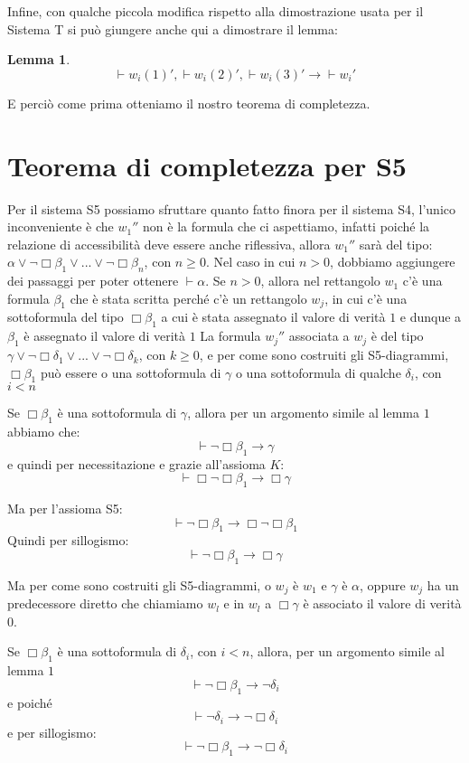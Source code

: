 \documentclass[a4paper, titlepage, 12pt]{report}
\newtheorem{lemma}{Lemma}[chapter]
\begin{document}
Infine, con qualche piccola modifica rispetto
alla dimostrazione usata per il Sistema T si può giungere anche qui a dimostrare il lemma:
\begin{lemma}
$$\vdash w_i(1)', \vdash w_i(2)', \vdash w_i(3)' \rightarrow \vdash w_i'$$
\end{lemma}

E perciò come prima otteniamo il nostro teorema di completezza.

\section{Teorema di completezza per S5}
Per il sistema S5 possiamo sfruttare quanto fatto finora per il sistema S4,
l'unico inconveniente è che $w_1''$ non è la formula che ci aspettiamo,
infatti poiché la relazione di accessibilità deve essere anche riflessiva,
allora $w_1''$ sarà del tipo: $\alpha \lor \neg \Box \beta_1 \lor ... \lor \neg \Box \beta_n$,
con $n \ge 0$.
Nel caso in cui $n > 0$, dobbiamo aggiungere dei passaggi per poter ottenere $\vdash \alpha$.
Se $n > 0$, allora nel rettangolo $w_1$ c'è una formula $\beta_1$ che è stata scritta
perché c'è un rettangolo $w_j$,
in cui c'è una sottoformula del tipo $\Box \beta_1$
a cui è stata assegnato il valore di verità $1$ e dunque a $\beta_1$ è assegnato il valore di verità $1$
La formula $w_j''$ associata a $w_j$ è del tipo $\gamma \lor \neg \Box \delta_1 \lor ... \lor \neg \Box \delta_k$, con $k \ge 0$,
e per come sono costruiti gli S5-diagrammi, $\Box \beta_1$ può essere o una sottoformula di $\gamma$
o una sottoformula di qualche $\delta_i$, con $i < n$

Se $\Box \beta_1$ è una sottoformula di $\gamma$, allora per un argomento simile al lemma $1$ abbiamo che:
$$\vdash \neg \Box \beta_1 \rightarrow \gamma$$
e quindi per necessitazione e grazie all'assioma $K$:
$$\vdash \Box \neg \Box \beta_1 \rightarrow \Box \gamma$$

Ma per l'assioma S5:
$$\vdash \neg \Box \beta_1 \rightarrow \Box \neg \Box \beta_1$$
Quindi per sillogismo:
$$\vdash \neg \Box \beta_1 \rightarrow \Box \gamma$$

Ma per come sono costruiti gli S5-diagrammi, o $w_j$ è $w_1$ e $\gamma$ è $\alpha$,
oppure $w_j$ ha un predecessore diretto
che chiamiamo $w_l$ e in $w_l$ a $\Box \gamma$ è associato il valore di verità $0$.

Se $\Box \beta_1$ è una sottoformula di $\delta_i$, con $i < n$,
allora, per un argomento simile al lemma $1$
$$ \vdash \neg \Box \beta_1 \rightarrow \neg \delta_i$$
e poiché
$$ \vdash \neg \delta_i \rightarrow \neg \Box \delta_i$$
e per sillogismo:
$$ \vdash \neg \Box \beta_1 \rightarrow \neg \Box \delta_i$$
\end{document}
